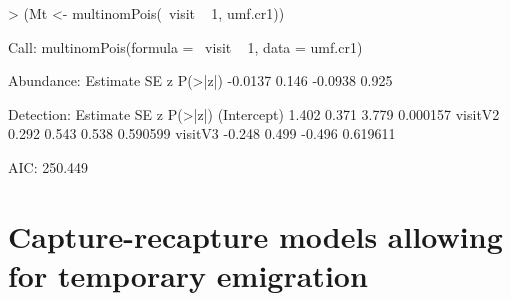 \documentclass[a4paper]{article}
\renewenvironment{Schunk}{\vspace{\topsep}}{\vspace{\topsep}}
\begin{document}
\begin{Schunk}
\begin{Sinput}
> (Mt <- multinomPois(~visit ~ 1, umf.cr1))
\end{Sinput}
\begin{Soutput}
Call:
multinomPois(formula = ~visit ~ 1, data = umf.cr1)

Abundance:
 Estimate    SE       z P(>|z|)
  -0.0137 0.146 -0.0938   0.925

Detection:
            Estimate    SE      z  P(>|z|)
(Intercept)    1.402 0.371  3.779 0.000157
visitV2        0.292 0.543  0.538 0.590599
visitV3       -0.248 0.499 -0.496 0.619611

AIC: 250.449 
\end{Soutput}
\end{Schunk}



\section{Capture-recapture models allowing for temporary emigration}




\end{document}
